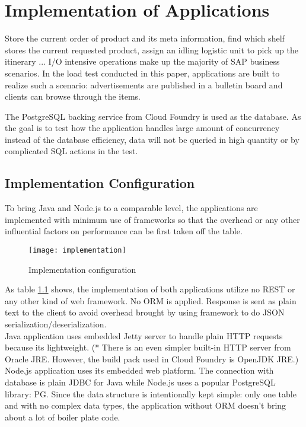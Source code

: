 \chapter{Implementation of Applications}
Store the current order of product and its meta information, find which shelf stores the current requested product, assign an idling logistic unit to pick up the itinerary ... I/O intensive operations make up the majority of SAP business scenarios. 
 In the load test conducted in this paper, applications are built to realize such a scenario: advertisements are published in a bulletin board and clients can browse through the items. 

The PostgreSQL backing service from Cloud Foundry is used as the database. As the goal is to test how the application handles large amount of concurrency instead of the database efficiency, data will not be queried in high quantity or by complicated SQL actions in the test. 

\section{Implementation Configuration}
To bring Java and Node.js to a comparable level, the applications are implemented with minimum use of frameworks so that the overhead or any other influential factors on performance can be first taken off the table.

 \begin{figure}[h]
 	\centering
 	\texttt{[image: implementation]}
 	\caption{Implementation configuration}
 	\label{implementation}
 \end{figure}

As table \ref{implementation} shows,  the implementation of both applications utilize no REST or any other kind of web framework. No ORM is applied. Response is sent as plain text to the client to avoid overhead brought by using framework to do JSON serialization/deserialization. \\
Java application uses embedded Jetty server to handle plain HTTP requests because its lightweight. (* There is an even simpler built-in HTTP server from Oracle JRE. However, the build pack used in Cloud Foundry is OpenJDK JRE.)  Node.js application uses its embedded web platform. The connection with database is plain JDBC for Java while Node.js uses a popular PostgreSQL library: PG. Since the data structure is intentionally kept simple: only one table and with no complex data types, the application without ORM doesn't bring about a lot of boiler plate code.  \\

